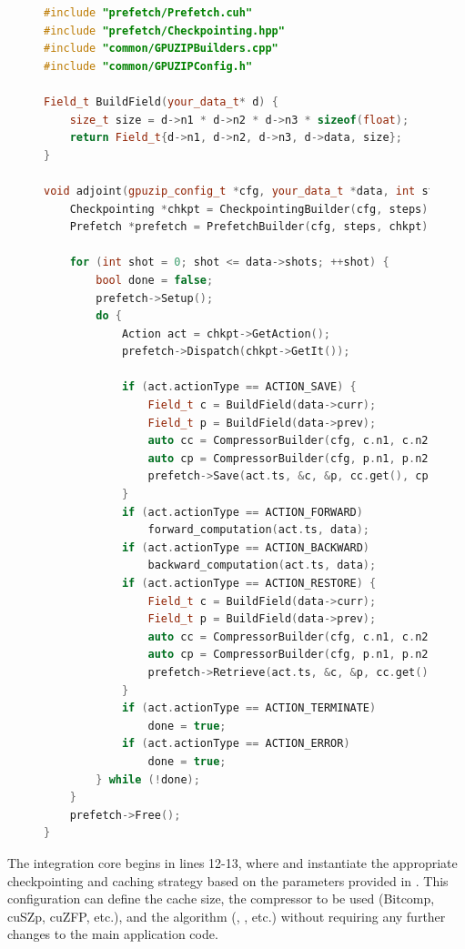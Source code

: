 \documentclass[Ingles,Final]{ic-tese-v3}
\begin{document}
\begin{figure}[h!]
\centering
\begin{lstlisting}[language=C++, caption={Example of an adjoint computation (such as RTM) integration with GPUZIP}, label={lst:cudaexample}]
#include "prefetch/Prefetch.cuh"
#include "prefetch/Checkpointing.hpp"
#include "common/GPUZIPBuilders.cpp"
#include "common/GPUZIPConfig.h"

Field_t BuildField(your_data_t* d) {
    size_t size = d->n1 * d->n2 * d->n3 * sizeof(float);
    return Field_t{d->n1, d->n2, d->n3, d->data, size};
}

void adjoint(gpuzip_config_t *cfg, your_data_t *data, int steps) {
    Checkpointing *chkpt = CheckpointingBuilder(cfg, steps);
    Prefetch *prefetch = PrefetchBuilder(cfg, steps, chkpt);

    for (int shot = 0; shot <= data->shots; ++shot) {
        bool done = false;
        prefetch->Setup();
        do {
            Action act = chkpt->GetAction();
            prefetch->Dispatch(chkpt->GetIt());

            if (act.actionType == ACTION_SAVE) {
                Field_t c = BuildField(data->curr);
                Field_t p = BuildField(data->prev);
                auto cc = CompressorBuilder(cfg, c.n1, c.n2, c.n3);
                auto cp = CompressorBuilder(cfg, p.n1, p.n2, p.n3);
                prefetch->Save(act.ts, &c, &p, cc.get(), cp.get());
            }
            if (act.actionType == ACTION_FORWARD)
                forward_computation(act.ts, data);
            if (act.actionType == ACTION_BACKWARD)
                backward_computation(act.ts, data);
            if (act.actionType == ACTION_RESTORE) {
                Field_t c = BuildField(data->curr);
                Field_t p = BuildField(data->prev);
                auto cc = CompressorBuilder(cfg, c.n1, c.n2, c.n3);
                auto cp = CompressorBuilder(cfg, p.n1, p.n2, p.n3);
                prefetch->Retrieve(act.ts, &c, &p, cc.get(), cp.get());
            }
            if (act.actionType == ACTION_TERMINATE)
                done = true;
            if (act.actionType == ACTION_ERROR)
                done = true;
        } while (!done);
    }
    prefetch->Free();
}
\end{lstlisting}
\end{figure}

The integration core begins in lines 12-13, where  and  instantiate the appropriate checkpointing and caching strategy based on the parameters provided in . This configuration  can define the cache size, the compressor to be used (Bitcomp, cuSZp, cuZFP, etc.), and the \checkpointing algorithm (\revolve, \zcut, etc.) without requiring any further changes to the main application code.
\end{document}
